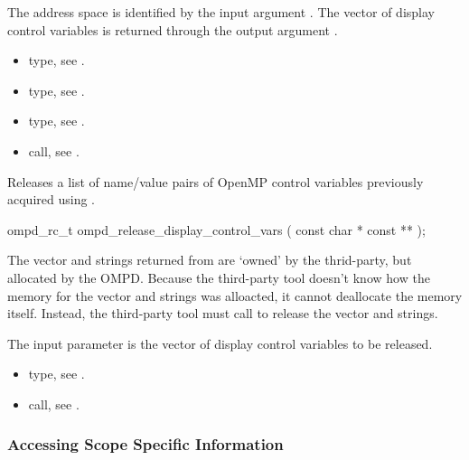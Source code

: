 \argdesc
The address space is identified by the input argument .
The vector of display control variables is returned through
the output argument .

\crossreferences
\begin{itemize}
  \item {} type, see .
	\item {} type, see .
	\item {} type, see .
	\item {} call, see .
\end{itemize}


\label{subsubsubsec:ompd_release_display_control_vars}
\summary

Releases a list of name/value pairs of OpenMP control variables
previously acquired using .
\format
\begin{cspecific}
\begin{ompSyntax}
ompd_rc_t ompd_release_display_control_vars (
  const char * const **
);
\end{ompSyntax}
\end{cspecific}

\descr
The vector and strings returned from 
are `owned' by the thrid-party, but allocated by the OMPD.
Because the third-party tool doesn't know how the memory for the vector
and strings was alloacted, it cannot deallocate the memory itself.
Instead, the third-party tool must call
 to release the vector
and strings.

\argdesc
The input parameter  is the vector of display control variables to be released.

\crossreferences
\begin{itemize}
  \item {} type, see .
	\item {} call, see .
\end{itemize}


\subsubsection{Accessing Scope Specific Information}

